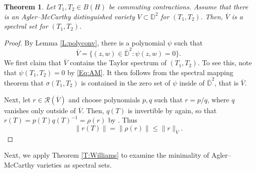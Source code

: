 \documentclass[10pt]{amsart}
\newcommand{\bD}{{\mathbb{D}}}
\newcommand{\R}{{\mathcal{R}}}
\newcommand{\ol}{\overline}
\newtheorem{theorem}[lemma]{Theorem}
\theoremstyle{definition}
\begin{document}
\begin{theorem}\label{T:AMratspectral}
Let $T_1,T_2\in B(H)$ be commuting contractions. Assume that there is an Agler--McCarthy distinguished variety $V\subset \bD^2$ for $(T_1,T_2)$. Then, $\ol{V}$ is a spectral set for $(T_1,T_2)$.
\end{theorem}
\begin{proof}
By Lemma \ref{L:polyconv}, there is a polynomial $\psi$ such that
\[
\ol{V}=\{(z,w)\in \ol{\bD}^2:\psi(z,w)=0\}.
\]
We first claim that $\ol{V}$ contains the Taylor spectrum of $(T_1,T_2)$. To see this, note that $\psi(T_1,T_2)=0$ by \eqref{Eq:AM}. It then follows from the spectral mapping theorem \cite[Theorem 7.7]{muller2007} that $\sigma(T_1,T_2)$ is contained in the zero set of $\psi$ inside of $\ol{\bD}^2$, that is $\ol{V}$.


Next, let $r\in \R(\ol{V})$ and choose polynomials $p,q$ such that $r=p/q$, where $q$ vanishes only outside of $\ol{V}$. Then, $q(T)$ is invertible by  \cite[Theorem 7.7]{muller2007} again, so that $r(T)=p(T)q(T)^{-1}=\rho(r)$ by  \cite[Theorem 30.7]{muller2007}. Thus
\[
\|r(T)\|=\|\rho(r)\|\leq \|r\|_{\ol{V}}.
\]
\end{proof}

Next, we apply  Theorem \ref{T:Williams} to examine the minimality of Agler--McCarthy varieties as spectral sets.
\end{document}
